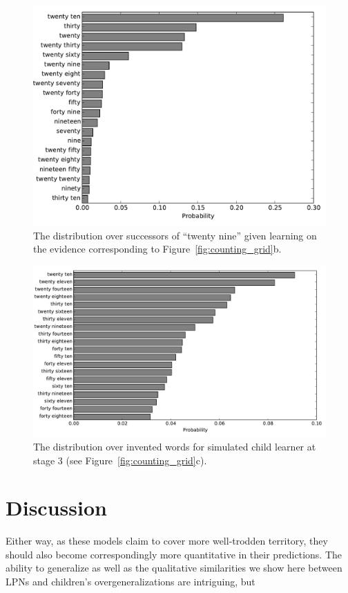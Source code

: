 \documentclass[10pt,letterpaper]{article}
\begin{document}
\begin{figure}
\includegraphics[width=0.9\linewidth]{figures/after29}
\caption{The distribution over successors of ``twenty nine'' given learning on the evidence corresponding to Figure~\ref{fig:counting_grid}b. \label{fig:after29}}
\end{figure}


\begin{figure}
\includegraphics[width=0.9\linewidth]{figures/inventedWords}
\caption{The distribution over invented words for simulated child
  learner at stage
  3 (see Figure~\ref{fig:counting_grid}c). \label{fig:inventedWords}}
\end{figure}


\section{Discussion}


Either way, as these models claim to cover more well-trodden
territory, they should also become correspondingly more quantitative
in their predictions. The ability to generalize as well as the
qualitative similarities we show here between LPNs and children's
overgeneralizations are intriguing, but 
\end{document}
